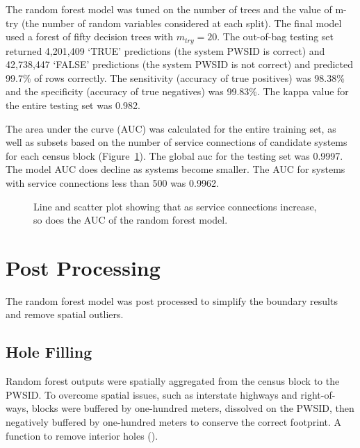 \documentclass[12pt]{article}
\begin{document}
The random forest model was tuned on the number of trees and the value
of m-try (the number of random variables considered at each split). The
final model used a forest of fifty decision trees with \(m_{try}=20\).
The out-of-bag testing set returned 4,201,409 `TRUE' predictions (the
system PWSID is correct) and 42,738,447 `FALSE' predictions (the system
PWSID is not correct) and predicted 99.7\% of rows correctly. The
sensitivity (accuracy of true positives) was 98.38\% and the specificity
(accuracy of true negatives) was 99.83\%. The kappa value for the entire
testing set was 0.982.

The area under the curve (AUC) was calculated for the entire training
set, as well as subsets based on the number of service connections of
candidate systems for each census block (Figure~\ref{fig-rfAUC}). The
global auc for the testing set was 0.9997. The model AUC does decline as
systems become smaller. The AUC for systems with service connections
less than 500 was 0.9962.

\begin{figure}


\caption{\label{fig-rfAUC}Line and scatter plot showing that as service
connections increase, so does the AUC of the random forest model.}

\end{figure}%

\section{Post Processing}\label{post-processing}

The random forest model was post processed to simplify the boundary
results and remove spatial outliers.

\subsection{Hole Filling}\label{hole-filling}

Random forest outputs were spatially aggregated from the census block to
the PWSID. To overcome spatial issues, such as interstate highways and
right-of-ways, blocks were buffered by one-hundred meters, dissolved on
the PWSID, then negatively buffered by one-hundred meters to conserve
the correct footprint. A function to remove interior holes
().
\end{document}
